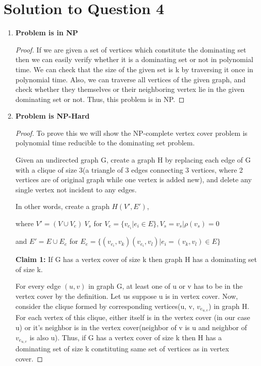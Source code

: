 \documentclass[11pt]{article}
\begin{document}
\section{Solution to Question 4}
\begin{enumerate}
	\item {\bf Problem is in NP}
		\begin{proof}
			If we are given a set of vertices which constitute the dominating set then we can easily verify whether it is a dominating set or not in polynomial time. We can check that the size of the given set is k by traversing it once in polynomial time. Also, we can traverse all vertices of the given graph, and check whether they themselves or their neighboring vertex lie in the given dominating set or not.
			Thus, this problem is in NP.
		\end{proof}

	\item {\bf Problem is NP-Hard}
		\begin{proof}
			To prove this we will show the NP-complete vertex cover problem is polynomial time reducible to the dominating set problem.

			Given an undirected graph G, create a graph H by replacing each edge of G with a clique of size 3(a triangle of 3 edges connecting 3 vertices, where 2 vertices are of original graph while one vertex is added new), and delete any single vertex not incident to any edges.

			In other words, create a graph $H(V', E')$,
			
			where $V' = (V \cup V_e) \ V_s$ for $V_e = \{v_{e_i}|e_i \in E\}, V_s = {v_s|\rho(v_s) = 0}$

			and $E' = E \cup E_e$ for $E_e = \{(v_{e_i},v_k)(v_{e_i},v_l)|e_i = (v_k, v_l) \in E\}$

   			{\bf Claim 1:} If G has a vertex cover of size k then graph H has a dominating set of size k.

			For every edge $(u, v)$ in graph G, at least one of u or v has to be in the vertex cover by the definition. Let us suppose u is in vertex cover. Now, consider the clique formed by corresponding vertices(u, v, $v_{e_{u,v}}$) in graph H. For each vertex of this clique, either itself is in the vertex cover (in our case u) or it's neighbor is in the vertex cover(neighbor of v is u and neighbor of $v_{e_{u,v}}$ is also u). Thus, if G has a vertex cover of size k then H has a dominating set of size k constituting same set of vertices as in vertex cover.


\end{proof}
\end{enumerate}
\end{document}
